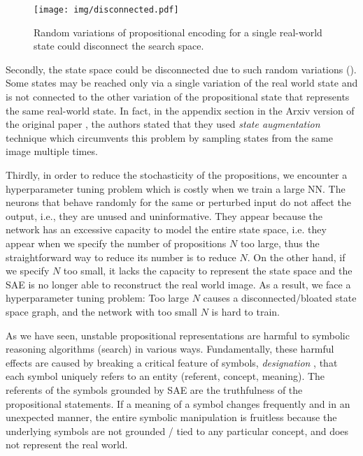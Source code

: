\begin{figure}[htb]
 \centering
 \texttt{[image: img/disconnected.pdf]}
 \caption{Random variations of propositional encoding for a single real-world state could disconnect the search space.}
 \label{disconnected}
\end{figure}

Secondly, the state space could be disconnected due to such random variations ().
Some states may be reached only via a single variation of the real world state and is not connected to the
other variation of the propositional state that represents the same real-world state.
In fact, in the appendix section in the Arxiv version of the original paper \cite{Asai2018},
the authors stated that they used \emph{state augmentation} technique
which circumvents this problem by sampling states from the same image multiple times.

Thirdly, in order to reduce the stochasticity of the propositions, we encounter a hyperparameter tuning problem
which is costly when we train a large NN.
% 
The neurons that behave randomly for the same or perturbed input do not affect the output,
i.e., they are unused and uninformative.
They appear because the network has an excessive capacity to 
model the entire state space, i.e. they appear when we specify the number of propositions $N$ too large,
thus the straightforward way to reduce its number is to reduce $N$.
On the other hand, if we specify $N$ too small, it lacks the capacity to represent the state space
and the SAE is no longer able to reconstruct the real world image.
As a result, we face a hyperparameter tuning problem: Too large $N$ causes a disconnected/bloated state space graph,
and the network with too small $N$ is hard to train.


As we have seen, unstable propositional representations are harmful to symbolic reasoning algorithms (search)
in various ways.
Fundamentally,
these harmful effects are caused by breaking a critical feature of symbols, \emph{designation} \cite{newell1976computer,newell1980physical},
that each symbol uniquely refers to an entity (referent, concept, meaning).
The referents of the symbols grounded by SAE are the truthfulness of the propositional statements.
If a meaning of a symbol changes frequently and in an unexpected manner, the entire symbolic manipulation is fruitless
because the underlying symbols are not grounded / tied to any particular concept, and does not represent the real world.


